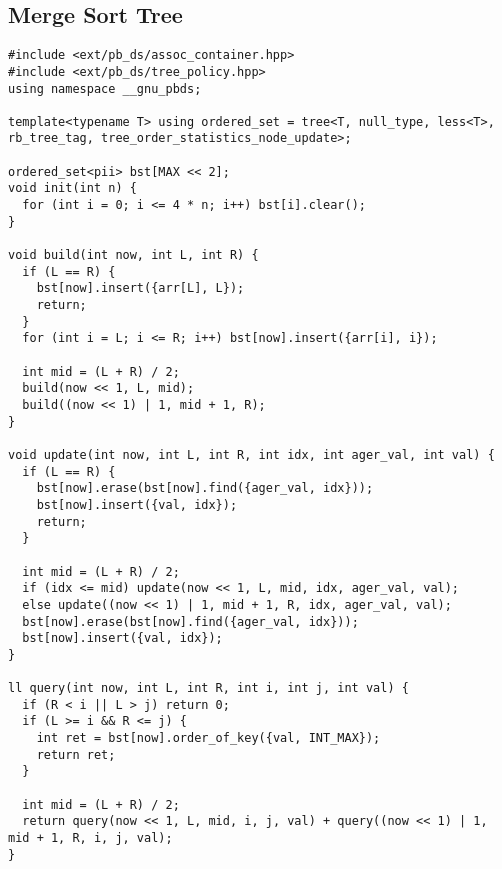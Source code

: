 \documentclass[10pt,a4paper,onesided]{article}
\begin{document}
\begin{multicols*}{3}
\subsection{Merge Sort Tree}
\begin{lstlisting}
#include <ext/pb_ds/assoc_container.hpp>
#include <ext/pb_ds/tree_policy.hpp>
using namespace __gnu_pbds;

template<typename T> using ordered_set = tree<T, null_type, less<T>, rb_tree_tag, tree_order_statistics_node_update>;

ordered_set<pii> bst[MAX << 2];
void init(int n) {
  for (int i = 0; i <= 4 * n; i++) bst[i].clear();
}

void build(int now, int L, int R) {
  if (L == R) {
    bst[now].insert({arr[L], L});
    return;
  }
  for (int i = L; i <= R; i++) bst[now].insert({arr[i], i});

  int mid = (L + R) / 2;
  build(now << 1, L, mid);
  build((now << 1) | 1, mid + 1, R);
}

void update(int now, int L, int R, int idx, int ager_val, int val) {
  if (L == R) {
    bst[now].erase(bst[now].find({ager_val, idx}));
    bst[now].insert({val, idx});
    return;
  }

  int mid = (L + R) / 2;
  if (idx <= mid) update(now << 1, L, mid, idx, ager_val, val);
  else update((now << 1) | 1, mid + 1, R, idx, ager_val, val);
  bst[now].erase(bst[now].find({ager_val, idx}));
  bst[now].insert({val, idx});
}

ll query(int now, int L, int R, int i, int j, int val) {
  if (R < i || L > j) return 0;
  if (L >= i && R <= j) {
    int ret = bst[now].order_of_key({val, INT_MAX});
    return ret;
  }

  int mid = (L + R) / 2;
  return query(now << 1, L, mid, i, j, val) + query((now << 1) | 1, mid + 1, R, i, j, val);
}

\end{lstlisting}

\end{multicols*}
\end{document}
